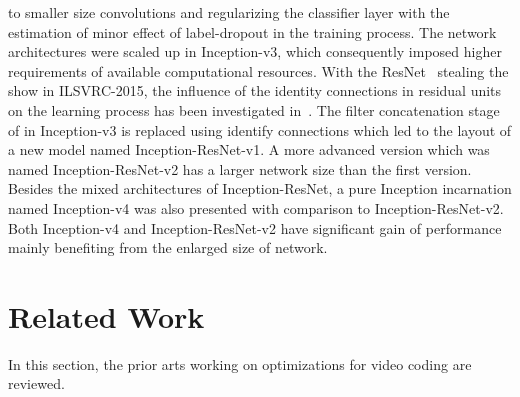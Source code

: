 to smaller size convolutions and regularizing the classifier layer with
the estimation of minor effect of label-dropout in the training process.
The network architectures were scaled up in Inception-v3, which consequently
imposed higher requirements of available computational resources.
With the ResNet~\parencite{RN67} stealing the show in ILSVRC-2015,
the influence of the
identity connections in residual units on the learning process
has been investigated in~\parencite{RN63}.
The filter concatenation stage of in Inception-v3 is replaced using identify
connections which led to the layout of a new model named Inception-ResNet-v1.
A more advanced version which was named Inception-ResNet-v2 has a larger
network size than the first version.
Besides the mixed architectures of Inception-ResNet, a pure Inception
incarnation named Inception-v4 was also presented with comparison to
Inception-ResNet-v2.
Both Inception-v4 and Inception-ResNet-v2 have significant gain of performance
mainly benefiting from the enlarged size of network.

\section{Related Work}\label{sec:related-work}
In this section, the prior arts working on optimizations for video
coding are reviewed.

